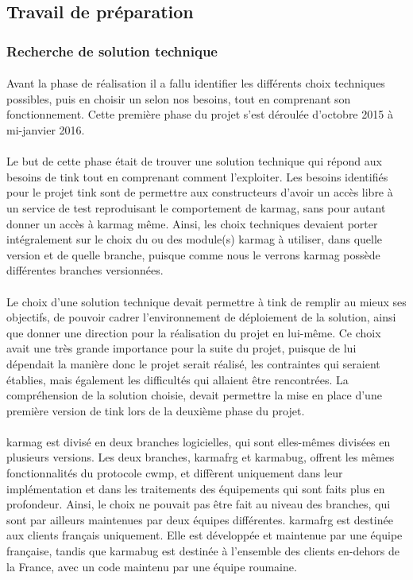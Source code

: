 \documentclass[12pt,a4paper]{report}
\begin{document}
\subsection{Travail de préparation} 
\subsubsection{Recherche de solution technique}
\paragraph*{}Avant la phase de réalisation il a fallu identifier les différents choix techniques possibles, puis en choisir un selon nos besoins, tout en comprenant son fonctionnement. Cette première phase du projet s’est déroulée d’octobre 2015 à mi-janvier 2016.
\paragraph*{}Le but de cette phase était de trouver une solution technique qui répond
aux besoins de \gls{tink} tout en comprenant comment l’exploiter. Les besoins identifiés pour le projet \gls{tink} sont de permettre aux constructeurs d’avoir un accès libre à un service de test reproduisant le comportement de \gls{karmag}, sans pour autant donner un accès à \gls{karmag} même. Ainsi, les choix techniques devaient porter intégralement sur le choix du ou des module(s) \gls{karmag} à utiliser, dans quelle version et de quelle branche, puisque comme nous le verrons \gls{karmag} possède différentes branches versionnées.
\paragraph*{}Le choix d’une solution technique devait permettre à \gls{tink} de remplir au mieux ses objectifs, de pouvoir cadrer l’environnement de déploiement de la solution, ainsi que donner une direction pour la réalisation du projet en lui-même. Ce choix avait une très grande importance pour la suite du projet, puisque de lui dépendait la manière donc le projet serait réalisé, les contraintes qui seraient établies, mais également les difficultés qui allaient être rencontrées. La compréhension de la solution choisie, devait permettre la mise en place d’une première version de \gls{tink} lors de la deuxième phase du projet.
\paragraph*{}\gls{karmag} est divisé en deux branches logicielles, qui sont elles-mêmes divisées en plusieurs versions. Les deux branches, \gls{karmafrg} et \gls{karmabug}, offrent les mêmes fonctionnalités du protocole \gls{cwmp}, et diffèrent uniquement dans leur implémentation et dans les traitements des équipements qui sont faits plus en profondeur. Ainsi, le choix ne pouvait pas être fait au niveau des branches, qui sont par ailleurs maintenues par deux équipes différentes. \gls{karmafrg} est destinée aux clients français uniquement. Elle est développée et maintenue par une équipe française, tandis que \gls{karmabug} est destinée à l’ensemble des clients en-dehors de la France, avec un code maintenu par une équipe roumaine.
\end{document}

